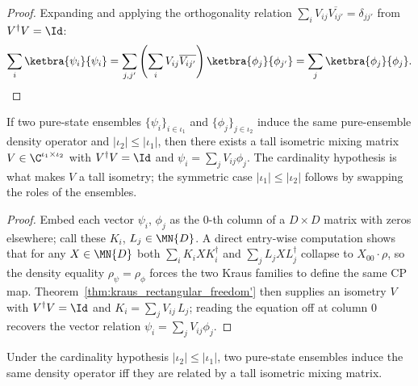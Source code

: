 \begin{proof}
    \leanok
    Expanding and applying the orthogonality relation
    $\sum_i V_{ij}\overline{V_{ij'}} = \delta_{j j'}$ from
    $V^\dagger V = \Id$:
    \[
        \sum_i \ketbra{\psi_i}{\psi_i}
        = \sum_{j, j'} \left(\sum_i V_{ij} \overline{V_{ij'}}\right)
        \ketbra{\phi_j}{\phi_{j'}}
        = \sum_j \ketbra{\phi_j}{\phi_j}.
    \]
\end{proof}

\begin{theorem}
    \label{thm:exists_isometric_mixing_of_pureEnsembleDensity_eq}
    \leanok
    If two pure-state ensembles $\{\psi_i\}_{i \in \iota_1}$ and
    $\{\phi_j\}_{j \in \iota_2}$ induce the same pure-ensemble density
    operator and $|\iota_2| \le |\iota_1|$, then there exists a tall
    isometric mixing matrix
    $V \in \C^{\iota_1 \times \iota_2}$ with
    $V^\dagger V = \Id$ and $\psi_i = \sum_j V_{ij} \phi_j$. The
    cardinality hypothesis is what makes $V$ a tall isometry; the
    symmetric case $|\iota_1| \le |\iota_2|$ follows by swapping the
    roles of the ensembles.
\end{theorem}

\begin{proof}
    \leanok
    Embed each vector $\psi_i$, $\phi_j$ as the $0$-th column of a
    $D \times D$ matrix with zeros elsewhere; call these
    $K_i$, $L_j \in \MN{D}$. A direct entry-wise computation
    shows that for any $X \in \MN{D}$ both
    $\sum_i K_i X K_i^\dagger$ and $\sum_j L_j X L_j^\dagger$ collapse
    to $X_{00} \cdot \rho$, so the density equality
    $\rho_\psi = \rho_\phi$ forces the two Kraus families to define the
    same CP map. Theorem~\ref{thm:kraus_rectangular_freedom'} then supplies an
    isometry $V$ with $V^\dagger V = \Id$ and
    $K_i = \sum_j V_{ij}\,L_j$; reading the equation off at column $0$
    recovers the vector relation
    $\psi_i = \sum_j V_{ij} \phi_j$.
\end{proof}

\begin{theorem}
    \label{thm:pureEnsembleDensity_eq_iff_exists_isometric_mixing}
    \leanok
    Under the cardinality hypothesis $|\iota_2| \le |\iota_1|$, two
    pure-state ensembles induce the same density operator iff they are
    related by a tall isometric mixing matrix.
\end{theorem}

